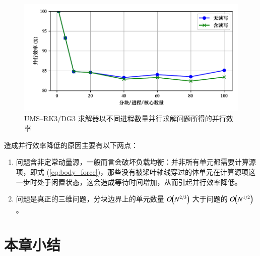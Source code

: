 \begin{figure}[h!]
\begin{centering}
\includegraphics[width=1\textwidth,height=0.3\textheight,keepaspectratio]{figures/upward/efficiency}
\par\end{centering}
\caption{\label{fig:rotor_upward_efficiency}UMS–RK3/DG3 求解器以不同进程数量并行求解问题所得的并行效率}
\end{figure}

造成并行效率降低的原因主要有以下两点：
\begin{enumerate}[wide]
\item {}问题含非定常动量源，一般而言会破坏负载均衡：并非所有单元都需要计算源项，即式
(\ref{eq:body_force})，那些没有被桨叶轴线穿过的体单元在计算源项这一步时处于闲置状态，这会造成等待时间增加，从而引起并行效率降低。
\item {}问题是真正的三维问题，分块边界上的单元数量
$\order{N^{2/3}}$ 大于问题的
$\order{N^{1/2}}$。
\end{enumerate}

\newpage{}

\section{本章小结}

